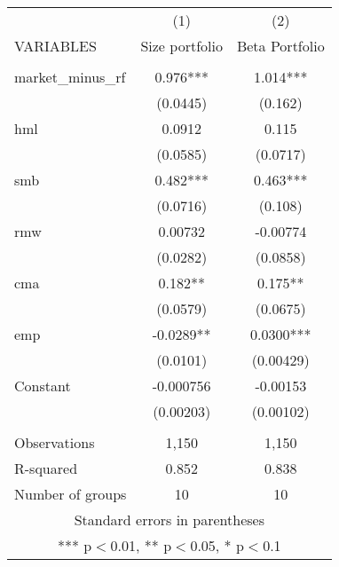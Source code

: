 \begin{tabular}{lcc} \hline
 & (1) & (2) \\
VARIABLES & Size portfolio & Beta Portfolio \\ \hline
 &  &  \\
market\_minus\_rf & 0.976*** & 1.014*** \\
 & (0.0445) & (0.162) \\
hml & 0.0912 & 0.115 \\
 & (0.0585) & (0.0717) \\
smb & 0.482*** & 0.463*** \\
 & (0.0716) & (0.108) \\
rmw & 0.00732 & -0.00774 \\
 & (0.0282) & (0.0858) \\
cma & 0.182** & 0.175** \\
 & (0.0579) & (0.0675) \\
emp & -0.0289** & 0.0300*** \\
 & (0.0101) & (0.00429) \\
Constant & -0.000756 & -0.00153 \\
 & (0.00203) & (0.00102) \\
 &  &  \\
Observations & 1,150 & 1,150 \\
R-squared & 0.852 & 0.838 \\
 Number of groups & 10 & 10 \\ \hline
\multicolumn{3}{c}{ Standard errors in parentheses} \\
\multicolumn{3}{c}{ *** p$<$0.01, ** p$<$0.05, * p$<$0.1} \\
\end{tabular}
